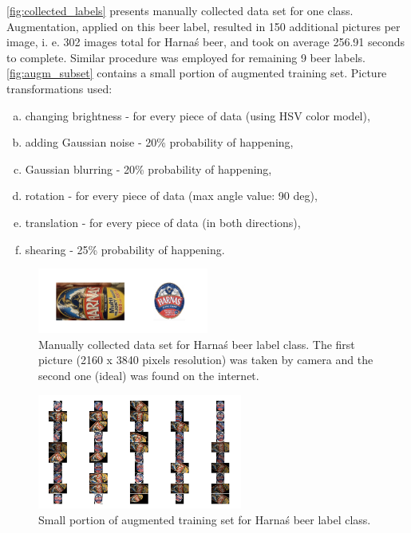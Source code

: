 \documentclass[11pt]{article}
\begin{document}
\autoref{fig:collected_labels} presents manually collected data set for one class. Augmentation, applied on this beer label, resulted in 150 additional pictures per image, i. e. 302 images total for \foreignlanguage{polish}{Harnaś} beer, and took on average 256.91 seconds to complete. Similar procedure was employed for remaining 9 beer labels. \autoref{fig:augm_subset} contains a small portion of augmented training set. Picture transformations used:
\begin{enumerate}[a)]
\item changing brightness - for every piece of data (using HSV color model),
\item adding Gaussian noise - 20\% probability of happening,
\item Gaussian blurring - 20\% probability of happening,
\item rotation - for every piece of data (max angle value: 90 deg),
\item translation - for every piece of data (in both directions),
\item shearing - 25\% probability of happening.
\end{enumerate}

\begin{figure}[h]
\includegraphics[width=0.5\textwidth]{collected_labels}
\centering
\caption{Manually collected data set for \foreignlanguage{polish}{Harnaś} beer label class. The first picture (2160 x 3840 pixels resolution) was taken by camera and the second one (ideal) was found on the internet.}
\label{fig:collected_labels}
\end{figure}

\begin{figure}[h]
\includegraphics[width=0.6\textwidth]{augm_subset}
\centering
\caption{Small portion of augmented training set for \foreignlanguage{polish}{Harnaś} beer label class.}
\label{fig:augm_subset}
\end{figure}
\end{document}
